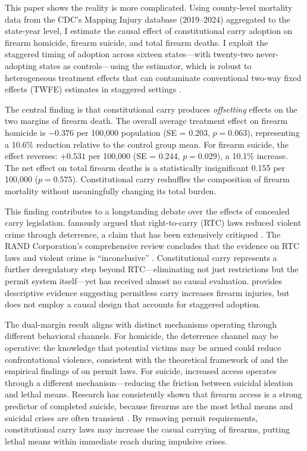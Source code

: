 \documentclass[12pt]{article}
\begin{document}
This paper shows the reality is more complicated. Using county-level mortality data from the CDC's Mapping Injury database (2019--2024) aggregated to the state-year level, I estimate the causal effect of constitutional carry adoption on firearm homicide, firearm suicide, and total firearm deaths. I exploit the staggered timing of adoption across sixteen states---with twenty-two never-adopting states as controls---using the \citet{callaway2021} estimator, which is robust to heterogeneous treatment effects that can contaminate conventional two-way fixed effects (TWFE) estimates in staggered settings \citep{goodmanbacon2021, dechaisemartin2020}.

The central finding is that constitutional carry produces \textit{offsetting} effects on the two margins of firearm death. The overall average treatment effect on firearm homicide is $-0.376$ per 100,000 population (SE = 0.203, $p = 0.063$), representing a 10.6\% reduction relative to the control group mean. For firearm suicide, the effect reverses: $+0.531$ per 100,000 (SE = 0.244, $p = 0.029$), a 10.1\% increase. The net effect on total firearm deaths is a statistically insignificant 0.155 per 100,000 ($p = 0.575$). Constitutional carry reshuffles the composition of firearm mortality without meaningfully changing its total burden.

This finding contributes to a longstanding debate over the effects of concealed carry legislation. \citet{lottmustard1997} famously argued that right-to-carry (RTC) laws reduced violent crime through deterrence, a claim that has been extensively critiqued \citep{aneja2011, duggan2001, donohue2019}. The RAND Corporation's comprehensive review concludes that the evidence on RTC laws and violent crime is ``inconclusive'' \citep{smart2023}. Constitutional carry represents a further deregulatory step beyond RTC---eliminating not just restrictions but the permit system itself---yet has received almost no causal evaluation. \citet{deboer2023} provides descriptive evidence suggesting permitless carry increases firearm injuries, but does not employ a causal design that accounts for staggered adoption.

The dual-margin result aligns with distinct mechanisms operating through different behavioral channels. For homicide, the deterrence channel may be operative: the knowledge that potential victims may be armed could reduce confrontational violence, consistent with the theoretical framework of \citet{lottmustard1997} and the empirical findings of \citet{crifasi2018} on permit laws. For suicide, increased access operates through a different mechanism---reducing the friction between suicidal ideation and lethal means. Research has consistently shown that firearm access is a strong predictor of completed suicide, because firearms are the most lethal means and suicidal crises are often transient \citep{miller2007, edwards2024}. By removing permit requirements, constitutional carry laws may increase the casual carrying of firearms, putting lethal means within immediate reach during impulsive crises.
\end{document}
